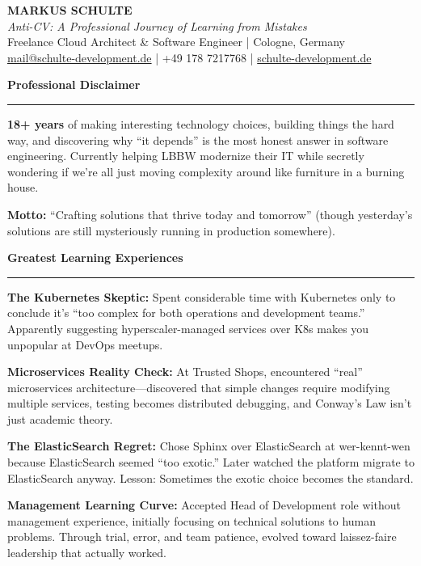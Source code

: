 \documentclass[11pt,a4paper]{article}
\newcommand{\sectionheader}[1]{
    \vspace{0.4em}
    {\Large \textbf{\textsf{\textcolor{primarycolor}{#1}}}}
    \vspace{0.2em}
    \hrule
    \vspace{0.3em}
}
\begin{document}
\begin{center}
{\Huge \textbf{\textsf{MARKUS SCHULTE}}} \\
\vspace{0.2em}
{\Large \textit{Anti-CV: A Professional Journey of Learning from Mistakes}} \\
\vspace{0.3em}
\textcolor{accentcolor}{Freelance Cloud Architect \& Software Engineer | Cologne, Germany} \\
\vspace{0.2em}
\href{mailto:mail@schulte-development.de}{mail@schulte-development.de} | +49 178 7217768 | \href{https://schulte-development.de}{schulte-development.de}
\end{center}

\sectionheader{Professional Disclaimer}

\textbf{18+ years} of making interesting technology choices, building things the hard way, and discovering why ``it depends'' is the most honest answer in software engineering. Currently helping LBBW modernize their IT while secretly wondering if we're all just moving complexity around like furniture in a burning house.

\textbf{Motto:} ``Crafting solutions that thrive today and tomorrow'' (though yesterday's solutions are still mysteriously running in production somewhere).

\sectionheader{Greatest Learning Experiences}

\textbf{The Kubernetes Skeptic:} Spent considerable time with Kubernetes only to conclude it's ``too complex for both operations and development teams.'' Apparently suggesting hyperscaler-managed services over K8s makes you unpopular at DevOps meetups.

\textbf{Microservices Reality Check:} At Trusted Shops, encountered ``real'' microservices architecture---discovered that simple changes require modifying multiple services, testing becomes distributed debugging, and Conway's Law isn't just academic theory.

\textbf{The ElasticSearch Regret:} Chose Sphinx over ElasticSearch at wer-kennt-wen because ElasticSearch seemed ``too exotic.'' Later watched the platform migrate to ElasticSearch anyway. Lesson: Sometimes the exotic choice becomes the standard.

\textbf{Management Learning Curve:} Accepted Head of Development role without management experience, initially focusing on technical solutions to human problems. Through trial, error, and team patience, evolved toward laissez-faire leadership that actually worked.
\end{document}

